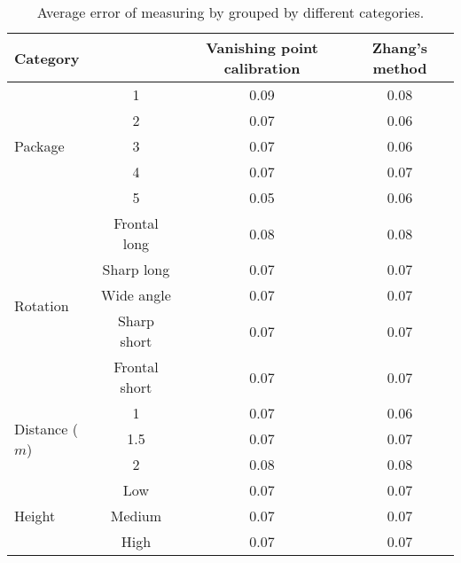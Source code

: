 \begin{table}%
\centering
\begin{tabular}{lccc}
\toprule
\multicolumn{2}{l}{Category} & Vanishing point calibration & Zhang's method\\
\midrule

\multirow{5}{*}{Package} 
& 1 & 0.09 & 0.08 \\
& 2 & 0.07 & 0.06 \\
& 3 & 0.07 & 0.06 \\
& 4 & 0.07 & 0.07 \\
& 5 & 0.05 & 0.06 \\
\midrule

\multirow{5}{*}{Rotation}
& Frontal long	& 0.08 & 0.08 \\\ 
& Sharp long	& 0.07 & 0.07 \\
& Wide angle 	& 0.07 & 0.07 \\
& Sharp short 	& 0.07 & 0.07 \\
& Frontal short	& 0.07 & 0.07 \\
\midrule
\multirow{3}{*}{Distance ($m$)} 
& 1 			& 0.07 & 0.06 \\
& 1.5  			& 0.07 & 0.07 \\
& 2 			& 0.08 & 0.08 \\
\midrule
\multirow{3}{*}{Height} 
& Low 		& 0.07 & 0.07 \\ 
& Medium 	& 0.07 & 0.07 \\
& High		& 0.07 & 0.07 \\
\bottomrule
 \end{tabular}
 \caption{Average error of measuring by grouped by different categories.}
\label{table:measuring_categories_error}
\end{table}
